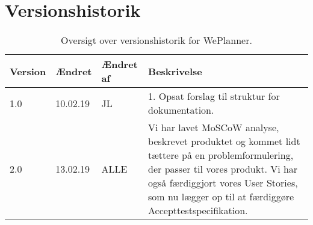 \chapter{Versionshistorik}
\begin{table}[H] 
	\centering 
	\begin{tabular}{|p{1.5cm}|p{1.5cm}|p{2cm}|p{8cm}|}
		\hline
\textbf{Version} & \textbf{Ændret}  &  \textbf{Ændret af} &   \textbf{Beskrivelse}  \\ \hline
1.0 &   10.02.19 & JL & 1. Opsat forslag til struktur for dokumentation. \\ \hline
2.0 &   13.02.19 & ALLE & Vi har lavet MoSCoW analyse, beskrevet produktet og kommet lidt tættere på en problemformulering, der passer til vores produkt. Vi har også færdiggjort vores User Stories, som nu lægger op til at færdiggøre Accepttestspecifikation.\\ \hline
	\end{tabular}
	\caption{Oversigt over versionshistorik for WePlanner.}
	\label{tab:versionshistorik}
\end{table}
\FloatBarrier